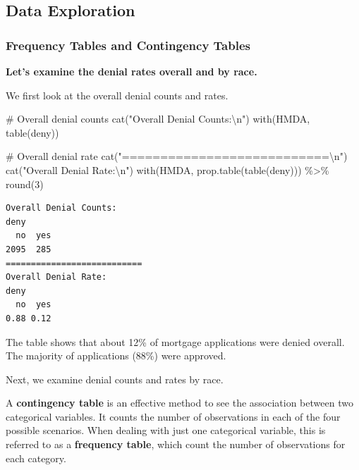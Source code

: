 \documentclass[
  12pt,
  a4paper,
]{scrbook}
\newenvironment{Shaded}{\begin{snugshade}}{\end{snugshade}}
\newcommand{\CommentTok}[1]{\textcolor[rgb]{0.37,0.37,0.37}{#1}}
\newcommand{\DecValTok}[1]{\textcolor[rgb]{0.68,0.00,0.00}{#1}}
\newcommand{\FunctionTok}[1]{\textcolor[rgb]{0.28,0.35,0.67}{#1}}
\newcommand{\NormalTok}[1]{\textcolor[rgb]{0.00,0.23,0.31}{#1}}
\newcommand{\SpecialCharTok}[1]{\textcolor[rgb]{0.37,0.37,0.37}{#1}}
\newcommand{\StringTok}[1]{\textcolor[rgb]{0.13,0.47,0.30}{#1}}
\theoremstyle{plain}
\theoremstyle{definition}
\theoremstyle{remark}
\begin{document}
\subsection{Data Exploration}\label{data-exploration}

\subsubsection{Frequency Tables and Contingency
Tables}\label{frequency-tables-and-contingency-tables}

\textbf{Let's examine the denial rates overall and by race.}

We first look at the overall denial counts and rates.

\begin{Shaded}
\begin{Highlighting}[]
\CommentTok{\# Overall denial counts}
\FunctionTok{cat}\NormalTok{(}\StringTok{"Overall Denial Counts:}\SpecialCharTok{\textbackslash{}n}\StringTok{"}\NormalTok{)}
\FunctionTok{with}\NormalTok{(HMDA, }\FunctionTok{table}\NormalTok{(deny))}

\CommentTok{\# Overall denial rate}
\FunctionTok{cat}\NormalTok{(}\StringTok{"===========================}\SpecialCharTok{\textbackslash{}n}\StringTok{"}\NormalTok{)}
\FunctionTok{cat}\NormalTok{(}\StringTok{"Overall Denial Rate:}\SpecialCharTok{\textbackslash{}n}\StringTok{"}\NormalTok{)}
\FunctionTok{with}\NormalTok{(HMDA, }\FunctionTok{prop.table}\NormalTok{(}\FunctionTok{table}\NormalTok{(deny))) }\SpecialCharTok{\%\textgreater{}\%} \FunctionTok{round}\NormalTok{(}\DecValTok{3}\NormalTok{)}
\end{Highlighting}
\end{Shaded}

\begin{verbatim}
Overall Denial Counts:
deny
  no  yes 
2095  285 
===========================
Overall Denial Rate:
deny
  no  yes 
0.88 0.12 
\end{verbatim}

The table shows that about 12\% of mortgage applications were denied
overall. The majority of applications (88\%) were approved.

Next, we examine denial counts and rates by race.

A {\textbf{contingency table}} is an effective method to see the
association between two categorical variables. It counts the number of
observations in each of the four possible scenarios. When dealing with
just one categorical variable, this is referred to as a
\textbf{frequency table}, which count the number of observations for
each category.
\end{document}
